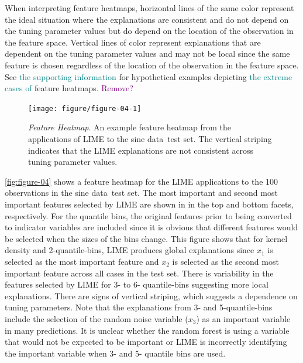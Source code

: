 \documentclass[AMS,STIX2COL]{WileyNJD-v2}\usepackage[]{graphicx}\usepackage[]{color}
\newenvironment{knitrout}{}{} %
\newcommand{\kgc}[1]{\textcolor{purple}{#1}}
\newcommand{\kge}[1]{\textcolor{teal}{#1}}
\newcommand{\data}{sine data}
\renewcommand{\sout}[1]{\unskip}
\begin{document}
When interpreting feature heatmaps, horizontal lines of the same color represent the ideal situation where the explanations are consistent and do not depend on the tuning parameter values but do depend on the location of the observation in the feature space. Vertical lines of color represent explanations that are dependent on the tuning parameter values and may not be local since the same feature is chosen regardless of the location of the observation in the feature space. See \kge{the supporting information} \sout{Appendix \ref{feat-heat-ex}} for hypothetical examples depicting \kge{the extreme cases of} feature heatmaps\kge{.} \sout{with the extreme cases of horizontal and vertical lines.} \kgc{Remove?}

\begin{figure}[!tp]
\begin{knitrout}
\color{fgcolor}

{\centering \texttt{[image: figure/figure-04-1]} 

}



\end{knitrout}
\caption{\emph{Feature Heatmap}. An example feature heatmap \sout{of the explanations} from the applications of LIME \sout{with different tuning parameter values} to the \data \ test set. The vertical striping indicates that the LIME explanations are not consistent across tuning parameter values.}
\label{fig:figure-04}
\end{figure}

\autoref{fig:figure-04} shows a feature heatmap for the LIME applications to the 100 observations in the \data \ test set. The most important and second most important features selected by LIME are shown in in the top and bottom facets, respectively. For the quantile bins, the original features prior to being converted to indicator variables are included since it is obvious that different features would be selected when the sizes of the bins change. This figure shows that for kernel density and 2-quantile-bins, LIME produces global explanations since $x_1$ is selected as the most important feature and $x_2$ is selected as the second most important feature across all cases in the test set. There is variability in the features selected by LIME for 3- to 6- quantile-bins suggesting more local explanations. There are signs of vertical striping, which suggests a dependence on tuning parameters. Note that the explanations from 3- and 5-quantile-bins include the selection of the random noise variable ($x_3$) as an important variable in many predictions\sout{, which would not be expected to be important to a random forest}. It is unclear whether the random forest is using a variable that would not be expected to be important or LIME is incorrectly identifying the important variable when 3- and 5- quantile bins are used.
\end{document}
